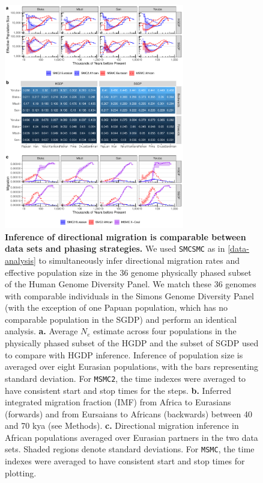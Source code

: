 \documentclass{article}
\begin{document}
\begin{figure}
	\centering
	\includegraphics[width=0.7\textwidth]{plot/both_figure.pdf}
	\caption{{\bf Inference of directional migration is comparable between data sets and phasing strategies.} We used {\tt SMCSMC} as in \ref{data-analysis} to simultaneously infer directional migration rates and effective population size in the 36 genome physically phased subset of the Human Genome Diversity Panel. We match these 36 genomes with comparable individuals in the Simons Genome Diversity Panel (with the exception of one Papuan population, which has no comparable population in the SGDP) and perform an identical analysis. {\bf a.} Average $N_e$ estimate across four populations in the physically phased subset of the HGDP and the subset of SGDP used to compare with HGDP inference. Inference of population size is averaged over eight Eurasian populations, with the bars representing standard deviation. For {\tt MSMC2}, the time indexes were averaged to have consistent start and stop times for the steps. {\bf b.} Inferred integrated migration fraction (IMF) from Africa to Eurasians (forwards) and from Eursaians to Africans (backwards) between 40 and 70 kya (see Methods). {\bf c.} Directional migration inference in African populations averaged over Eurasian partners in the two data sets. Shaded regions denote standard deviations. For {\tt MSMC}, the time indexes were averaged to have consistent start and stop times for plotting.}
	\label{fig:both}
\end{figure}
\end{document}
